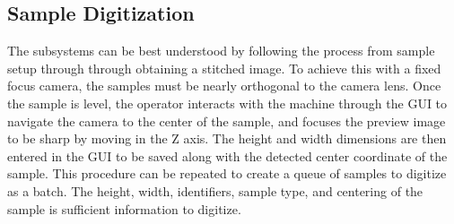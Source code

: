 \documentclass[a4paper,12pt]{article}
\begin{document}
\subsection{Sample Digitization} %
The subsystems can be best understood by following the process from sample setup through through obtaining a stitched image. 
To achieve this with a fixed focus camera, the samples must be nearly orthogonal to the camera lens. 
Once the sample is level, the operator interacts with the machine through the GUI to navigate the camera to the center of the sample, and focuses the preview image to be sharp by moving in the Z axis. The height and width dimensions are then entered in the GUI
to be saved along with the detected center coordinate of the sample. This procedure can be repeated to create a queue of samples to digitize as a batch.
The height, width, identifiers, sample type, and centering of the sample is sufficient information to digitize.
\end{document}
